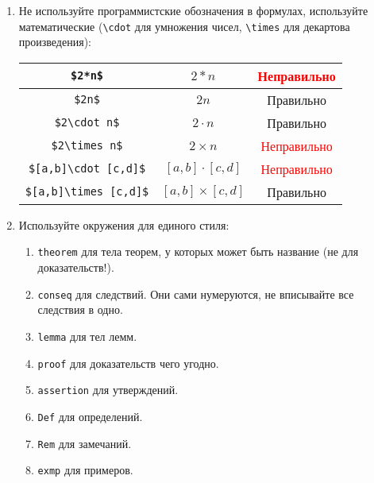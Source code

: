 \documentclass[12pt,a4paper]{book}
\newcounter{theorem}[section]
\newcounter{conseq}[theorem]
\newcommand{\ok}{& \textcolor{green!60!black}{Правильно}}
\newcommand{\bad}{& \textcolor{red}{Неправильно}}
\begin{document}
\begin{enumerate}
\item
	Не используйте программистские обозначения в формулах, используйте математические 
	(\verb!\cdot! для умножения чисел, \verb!\times! для декартова произведения):
	\begin{center}\begin{tabular}{|c|c|c|}
		\hline \verb!$2*n$! & $2*n$ \bad \\
		\hline \verb!$2n$! & $2n$ \ok \\
		\hline \verb!$2\cdot n$! & $2\cdot n$ \ok \\
		\hline \verb!$2\times n$! & $2\times n$ \bad \\
		\hline \verb!$[a,b]\cdot [c,d]$! & $[a,b]\cdot [c,d]$ \bad \\
		\hline \verb!$[a,b]\times [c,d]$! & $[a,b]\times [c,d]$ \ok \\
		\hline
	\end{tabular}\end{center}

\item 
	Используйте окружения для единого стиля:
	\begin{enumerate}
		\item \verb'theorem' для тела теорем, у которых может быть название (не для доказательств!).
		\item \verb'conseq' для следствий. Они сами нумеруются, не вписывайте все следствия в одно.
		\item \verb'lemma' для тел лемм.
		\item \verb'proof' для доказательств чего угодно.
		\item \verb'assertion' для утверждений.
		\item \verb'Def' для определений.
		\item \verb'Rem' для замечаний.
		\item \verb'exmp' для примеров.
	\end{enumerate}


\end{enumerate}
\end{document}
